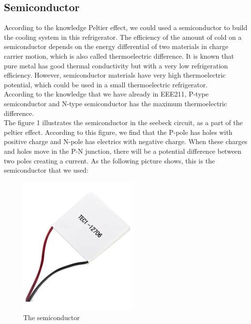 \documentclass[12pt,onecolumn]{article}
\begin{document}
\subsection{Semiconductor}
According to the knowledge Peltier effect, we could used a semiconductor to build the cooling system in this refrigerator. The efficiency of the amount of cold on a semiconductor depends on the energy differential of two materials in charge carrier motion, which is also called thermoelectric difference. It is known that pure metal has good thermal conductivity but with a very low refrigeration efficiency. However, semiconductor materials have very high thermoelectric potential, which could be used in a small thermoelectric refrigerator.\\
According to the knowledge that we have already in EEE211, P-type semiconductor and N-type semiconductor has the maximum thermoelectric difference.\\
The figure 1 illustrates the semiconductor in the seebeck circuit, as a part of the peltier effect. According to this figure, we find that the P-pole has holes with positive charge and N-pole has electrics with negative charge. When these charges and holes move in the P-N junction, there will be a potential difference between two poles creating a current. 
As the following picture shows, this is the semiconductor that we used:
\begin{figure}[H]
\centering
\includegraphics[width=6cm]{semiconductor}
\caption{The semiconductor}
\end{figure}
\end{document}
